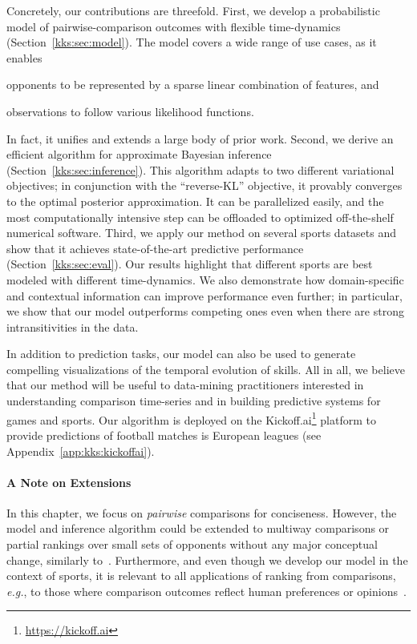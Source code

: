 Concretely, our contributions are threefold.
First, we develop a probabilistic model of pairwise-comparison outcomes with flexible time-dynamics (Section~\ref{kks:sec:model}).
The model covers a wide range of use cases, as it enables
\begin{enuminline}
	\item opponents to be represented by a sparse linear combination of features, and
	\item observations to follow various likelihood functions.
\end{enuminline}
In fact, it unifies and extends a large body of prior work.
Second, we derive an efficient algorithm for approximate Bayesian inference (Section~\ref{kks:sec:inference}).
This algorithm adapts to two different variational objectives;
in conjunction with the ``reverse-KL'' objective, it provably converges to the optimal posterior approximation.
It can be parallelized easily, and the most computationally intensive step can be offloaded to optimized off-the-shelf numerical software.
Third, we apply our method on several sports datasets and show that it achieves state-of-the-art predictive performance (Section~\ref{kks:sec:eval}).
Our results highlight that different sports are best modeled with different time-dynamics.
We also demonstrate how domain-specific and contextual information can improve performance even further;
in particular, we show that our model outperforms competing ones even when there are strong intransitivities in the data.

In addition to prediction tasks, our model can also be used to generate compelling visualizations of the temporal evolution of skills.
All in all, we believe that our method will be useful to data-mining practitioners interested in understanding comparison time-series and in building predictive systems for games and sports.
Our algorithm is deployed on the Kickoff.ai\footnote{\href{https://kickoff.ai}{https://kickoff.ai}} platform to provide predictions of football matches is European leagues (see Appendix~\ref{app:kks:kickoffai}).

\paragraph{A Note on Extensions}
In this chapter, we focus on \emph{pairwise} comparisons for conciseness.
However, the model and inference algorithm could be extended to multiway comparisons or partial rankings over small sets of opponents without any major conceptual change, similarly to~\citet{herbrich2006trueskill}.
Furthermore, and even though we develop our model in the context of sports, it is relevant to all applications of ranking from comparisons, \textit{e.g.}, to those where comparison outcomes reflect human preferences or opinions~\citep{thurstone1927law, mcfadden1973conditional, salganik2015wiki}.
